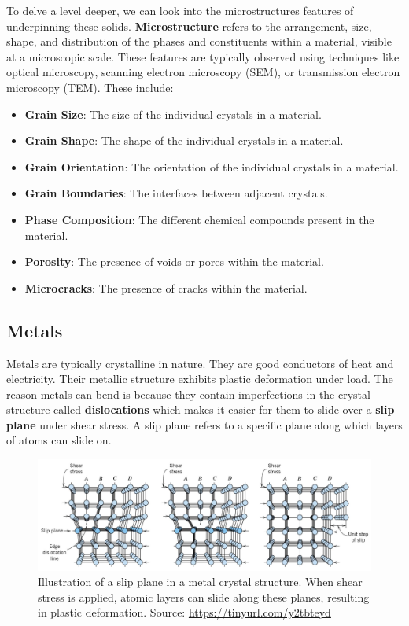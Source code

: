 \documentclass[12pt]{article}
\begin{document}
To delve a level deeper, we can look into the microstructures features of
underpinning these solids. \textbf{Microstructure} refers to the arrangement,
size, shape, and distribution of the phases and constituents within a material,
visible at a microscopic scale. These features are typically observed using
techniques like optical microscopy, scanning electron microscopy (SEM), or
transmission electron microscopy (TEM). These include:
\begin{itemize}
    \item \textbf{Grain Size}: The size of the individual crystals in a material.
    \item \textbf{Grain Shape}: The shape of the individual crystals in a material.
    \item \textbf{Grain Orientation}: The orientation of the individual crystals in a material.
    \item \textbf{Grain Boundaries}: The interfaces between adjacent crystals.
    \item \textbf{Phase Composition}: The different chemical compounds present in the material.
    \item \textbf{Porosity}: The presence of voids or pores within the material.
    \item \textbf{Microcracks}: The presence of cracks within the material.
\end{itemize}

\subsection{Metals}
Metals are typically crystalline in nature. They are good conductors of heat
and electricity. Their metallic structure exhibits plastic deformation under
load. The reason metals can bend is because they contain imperfections in the
crystal structure called \textbf{dislocations} which makes it easier for them
to slide over a \textbf{slip plane} under shear stress. A slip plane refers to
a specific plane along which layers of atoms can slide on.

\begin{figure}[h]
    \centering
    \includegraphics[width=1\textwidth]{figures/chapter_2/slip_plane.png}
    \caption{Illustration of a slip plane in a metal crystal structure. When shear stress is applied, atomic layers can slide along these planes, resulting in plastic deformation. Source: \url{https://tinyurl.com/y2tbteyd}}\label{fig:slip_plane}
\end{figure}
\end{document}
